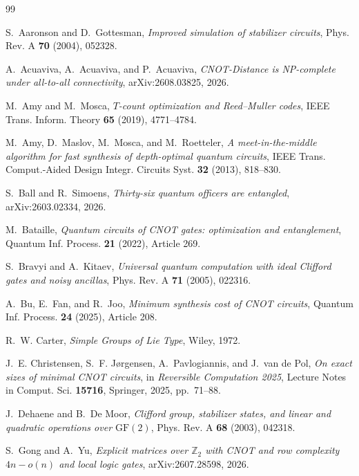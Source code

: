 \begin{thebibliography}{99}

S.~Aaronson and D.~Gottesman,
\emph{Improved simulation of stabilizer circuits},
Phys. Rev. A \textbf{70} (2004), 052328.

A.~Acuaviva, A.~Acuaviva, and P.~Acuaviva,
\emph{CNOT-Distance is NP-complete under all-to-all connectivity},
arXiv:2608.03825, 2026.

M.~Amy and M.~Mosca,
\emph{$T$-count optimization and Reed--Muller codes},
IEEE Trans. Inform. Theory \textbf{65} (2019), 4771--4784.

M.~Amy, D.~Maslov, M.~Mosca, and M.~Roetteler,
\emph{A meet-in-the-middle algorithm for fast synthesis of depth-optimal quantum circuits},
IEEE Trans. Comput.-Aided Design Integr. Circuits Syst. \textbf{32} (2013), 818--830.

S.~Ball and R.~Simoens,
\emph{Thirty-six quantum officers are entangled},
arXiv:2603.02334, 2026.

M.~Bataille,
\emph{Quantum circuits of CNOT gates: optimization and entanglement},
Quantum Inf. Process. \textbf{21} (2022), Article 269.

S.~Bravyi and A.~Kitaev,
\emph{Universal quantum computation with ideal Clifford gates and noisy ancillas},
Phys. Rev. A \textbf{71} (2005), 022316.

A.~Bu, E.~Fan, and R.~Joo,
\emph{Minimum synthesis cost of CNOT circuits},
Quantum Inf. Process. \textbf{24} (2025), Article 208.

R.~W. Carter,
\emph{Simple Groups of Lie Type},
Wiley, 1972.

J.~E. Christensen, S.~F. J\o rgensen, A.~Pavlogiannis, and J.~van de Pol,
\emph{On exact sizes of minimal CNOT circuits},
in \emph{Reversible Computation 2025}, Lecture Notes in Comput. Sci. \textbf{15716}, Springer, 2025, pp.~71--88.

J.~Dehaene and B.~De Moor,
\emph{Clifford group, stabilizer states, and linear and quadratic operations over $\mathrm{GF}(2)$},
Phys. Rev. A \textbf{68} (2003), 042318.

S.~Gong and A.~Yu,
\emph{Explicit matrices over $\mathbb Z_2$ with CNOT and row complexity $4n-o(n)$ and local logic gates},
arXiv:2607.28598, 2026.


\end{thebibliography}
